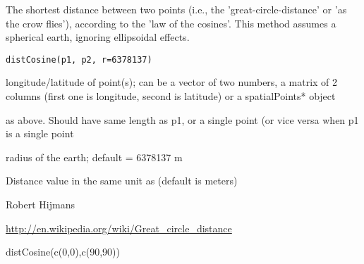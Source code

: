 \begin{Description}\relax
The shortest distance between two points (i.e., the 'great-circle-distance' or 'as the crow flies'), according to the 'law of the cosines'.
This method assumes a spherical earth, ignoring ellipsoidal effects.
\end{Description}
\begin{Usage}
\begin{verbatim}
distCosine(p1, p2, r=6378137)
\end{verbatim}
\end{Usage}
\begin{Arguments}
\begin{ldescription}
\item[\code{p1}] longitude/latitude of point(s); can be a vector of two numbers, a matrix of 2 columns (first one is longitude, second is latitude) or a spatialPoints* object
\item[\code{p2}] as above. Should have same length as p1, or a single point (or vice versa when p1 is a single point
\item[\code{r}] radius of the earth; default = 6378137 m
\end{ldescription}
\end{Arguments}
\begin{Value}
Distance value in the same unit as  (default is meters)
\end{Value}
\begin{Author}\relax
Robert Hijmans
\end{Author}
\begin{References}\relax
\url{http://en.wikipedia.org/wiki/Great_circle_distance}
\end{References}
\begin{SeeAlso}\relax
{}
\end{SeeAlso}
\begin{Examples}
\begin{ExampleCode}
distCosine(c(0,0),c(90,90))
\end{ExampleCode}
\end{Examples}

